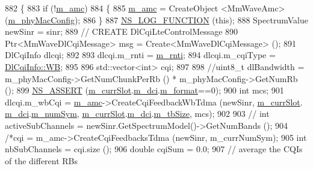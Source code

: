 \begin{DoxyCode}
882 \{
883         \textcolor{keywordflow}{if} (!\hyperlink{classns3_1_1MmWaveUePhy_a141a0292d9466b2a14baaf07df937e50}{m\_amc})
884         \{
885                 \hyperlink{classns3_1_1MmWaveUePhy_a141a0292d9466b2a14baaf07df937e50}{m\_amc} = CreateObject <MmWaveAmc> (\hyperlink{classns3_1_1MmWavePhy_a869abf36bbdbb94eed77ba6e4846f6e4}{m\_phyMacConfig});
886         \}
887         \hyperlink{log-macros-disabled_8h_a90b90d5bad1f39cb1b64923ea94c0761}{NS\_LOG\_FUNCTION} (\textcolor{keyword}{this});
888         SpectrumValue newSinr = sinr;
889         \textcolor{comment}{// CREATE DlCqiLteControlMessage}
890         Ptr<MmWaveDlCqiMessage> msg = Create<MmWaveDlCqiMessage> ();
891         DlCqiInfo dlcqi;
892 
893         dlcqi.m\_rnti = \hyperlink{classns3_1_1MmWaveUePhy_aae63c66b69de47ac19b4033ecf4bc211}{m\_rnti};
894         dlcqi.m\_cqiType = \hyperlink{structns3_1_1DlCqiInfo_a58a9fff4b49e4a8df1fdea1005c4735caa1097f844b06ac6dbdbac42802ba2403}{DlCqiInfo::WB};
895 
896         std::vector<int> cqi;
897 
898         \textcolor{comment}{//uint8\_t dlBandwidth = m\_phyMacConfig->GetNumChunkPerRb () * m\_phyMacConfig->GetNumRb ();}
899         \hyperlink{assert_8h_a6dccdb0de9b252f60088ce281c49d052}{NS\_ASSERT} (\hyperlink{classns3_1_1MmWaveUePhy_a6cd22c1e7d78e05be8a83ad1c6071f13}{m\_currSlot}.\hyperlink{structns3_1_1SlotAllocInfo_a480bd3a92cebe515c6720cba5e6b4e2c}{m\_dci}.\hyperlink{structns3_1_1DciInfoElementTdma_aeda75e5efb543bd26da3fcc3405af165}{m\_format}==0);
900         \textcolor{keywordtype}{int} mcs;
901         dlcqi.m\_wbCqi = \hyperlink{classns3_1_1MmWaveUePhy_a141a0292d9466b2a14baaf07df937e50}{m\_amc}->CreateCqiFeedbackWbTdma (newSinr, \hyperlink{classns3_1_1MmWaveUePhy_a6cd22c1e7d78e05be8a83ad1c6071f13}{m\_currSlot}.
      \hyperlink{structns3_1_1SlotAllocInfo_a480bd3a92cebe515c6720cba5e6b4e2c}{m\_dci}.\hyperlink{structns3_1_1DciInfoElementTdma_af4e642506d06a85b0f2358845f50ec5b}{m\_numSym}, \hyperlink{classns3_1_1MmWaveUePhy_a6cd22c1e7d78e05be8a83ad1c6071f13}{m\_currSlot}.\hyperlink{structns3_1_1SlotAllocInfo_a480bd3a92cebe515c6720cba5e6b4e2c}{m\_dci}.\hyperlink{structns3_1_1DciInfoElementTdma_a2cc720bbd0eae0cdd05186ef25b9a8e7}{m\_tbSize}, mcs);
902 
903 \textcolor{comment}{//      int activeSubChannels = newSinr.GetSpectrumModel()->GetNumBands ();}
904         \textcolor{comment}{/*cqi = m\_amc->CreateCqiFeedbacksTdma (newSinr, m\_currNumSym);}
905 \textcolor{comment}{        int nbSubChannels = cqi.size ();}
906 \textcolor{comment}{        double cqiSum = 0.0;}
907 \textcolor{comment}{        // average the CQIs of the different RBs}

\end{DoxyCode}
